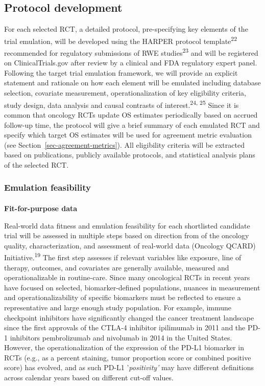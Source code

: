 \documentclass[
  letterpaper,
  DIV=11,
  numbers=noendperiod]{scrartcl}
\makeatletter
\let\oldparagraph\paragraph
\renewcommand{\paragraph}{
    \@ifstar
      \xxxParagraphStar
      \xxxParagraphNoStar
  }
\newcommand{\xxxParagraphStar}[1]{\oldparagraph*{#1}\mbox{}}
\newcommand{\xxxParagraphNoStar}[1]{\oldparagraph{#1}\mbox{}}
\makeatother
\begin{document}
\subsection{Protocol development}\label{protocol-development}

For each selected RCT, a detailed protocol, pre-specifying key elements
of the trial emulation, will be developed using the HARPER protocol
template\textsuperscript{22} recommended for regulatory submissions of
RWE studies\textsuperscript{23} and will be registered on
ClinicalTrials.gov after review by a clinical and FDA regulatory expert
panel. Following the target trial emulation framework, we will provide
an explicit statement and rationale on how each element will be emulated
including database selection, covariate measurement, operationalization
of key eligibility criteria, study design, data analysis and causal
contrasts of interest.\textsuperscript{24, 25} Since it is common that
oncology RCTs update OS estimates periodically based on accrued
follow-up time, the protocol will give a brief summary of each emulated
RCT and specify which target OS estimates will be used for agreement
metric evaluation (see Section~\ref{sec-agreement-metrics}). All
eligibility criteria will be extracted based on publications, publicly
available protocols, and statistical analysis plans of the selected RCT.

\subsubsection{Emulation feasibility}\label{emulation-feasibility}

\paragraph{\texorpdfstring{\textbf{Fit-for-purpose
data}}{Fit-for-purpose data}}\label{fit-for-purpose-data}

Real-world data fitness and emulation feasibility for each shortlisted
candidate trial will be assessed in multiple steps based on direction
from of the oncology quality, characterization, and assessment of
real-world data (Oncology QCARD) Initiative.\textsuperscript{19} The
first step assesses if relevant variables like exposure, line of
therapy, outcomes, and covariates are generally available, measured and
operationalizable in routine-care. Since many oncological RCTs in recent
years have focused on selected, biomarker-defined populations, nuances
in measurement and operationalizability of specific biomarkers must be
reflected to ensure a representative and large enough study population.
For example, immune checkpoint inhibitors have significantly changed the
cancer treatment landscape since the first approvals of the CTLA-4
inhibitor ipilimumab in 2011 and the PD-1 inhibitors pembrolizumab and
nivolumab in 2014 in the United States. However, the operationalization
of the expression of the PD-L1 biomarker in RCTs (e.g., as a percent
staining, tumor proportion score or combined positive score) has
evolved, and as such PD-L1 '\emph{positivity'} may have different
definitions across calendar years based on different cut-off values.
\end{document}
